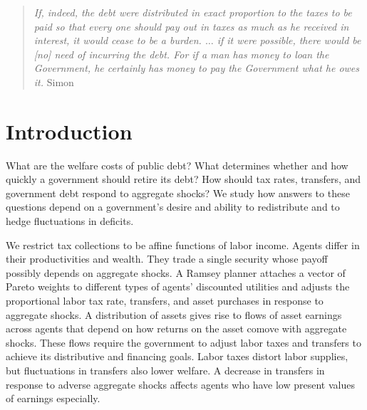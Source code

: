 \documentclass[thmsb,11pt]{article}
\begin{document}
\bigskip \newpage

\setcounter{page}{1}

\bigskip \baselineskip0.65cm


%


%

 \begin{quote}
 \emph{If, indeed, the debt were distributed in exact proportion to the taxes
 to be paid so that every one should pay out in taxes as much as he received
 in interest, it would cease to be a burden.%
 $\ldots$ if it were possible, there
 would be [no] need of incurring the debt. For if a man has money to loan the
 Government, he certainly has money to pay the Government what he owes it.
 }Simon \citet[p.85]{newcomb1865critical}
 \end{quote}



\section{Introduction}
\color{black}
What are the welfare costs of public debt? What determines whether and how quickly a government should retire its debt? How should  tax rates, transfers, and government debt respond to aggregate shocks? We study how answers to these questions depend on a government's desire and ability to redistribute
and to hedge fluctuations in deficits.

We restrict tax collections to be   affine functions of labor income. Agents differ in
their productivities and wealth.  They  trade a single  security whose payoff possibly depends on aggregate shocks.
A Ramsey planner attaches  a  vector of Pareto weights to different types of agents' discounted utilities and adjusts
the proportional labor  tax rate, transfers, and asset purchases in response to aggregate shocks. A distribution of assets  gives rise to  flows of asset earnings across  agents that depend on how returns on the asset comove with aggregate shocks. These
  flows require the government  to adjust labor taxes and transfers  to achieve its distributive and financing goals. Labor taxes distort  labor supplies, but fluctuations in  transfers also lower welfare. A decrease in transfers in response to adverse aggregate shocks  affects agents who have low present values of earnings especially.
\end{document}
